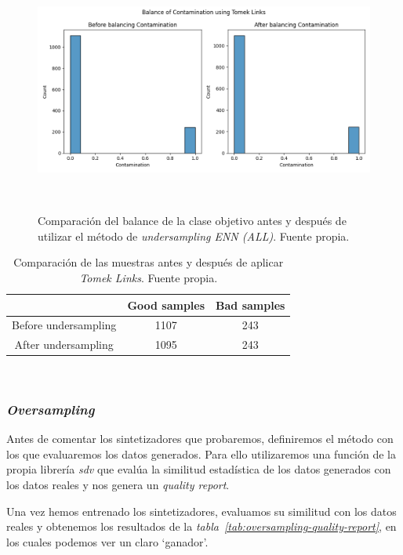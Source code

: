 \begin{figure}[!ht]
    \centering
    \includegraphics[width=0.8\linewidth]{media/images/balance.png}
    \caption{Comparación del balance de la clase objetivo antes y después de utilizar el método de \textit{undersampling ENN (ALL)}. Fuente propia.}\ \label{fig:balance-tl}
\end{figure}

\begin{table}
    \centering
    \begin{tabular}{|c|cc|} \hline
        & Good samples & Bad samples \\ \hline
        Before undersampling & 1107 & 243 \\
        After undersampling & 1095 & 243 \\ \hline
    \end{tabular}
    \caption{Comparación de las muestras antes y después de aplicar \textit{Tomek Links}. Fuente propia.}\ \label{tab:balance-tl-comparison}
\end{table}


\clearpage

\subsubsection{\textit{Oversampling}}

Antes de comentar los sintetizadores que probaremos, definiremos el método con los que evaluaremos los datos generados. Para ello utilizaremos una función de la propia librería \textit{sdv} que evalúa la similitud estadística de los datos generados con los datos reales y nos genera un \textit{quality report}.

Una vez hemos entrenado los sintetizadores, evaluamos su similitud con los datos reales y obtenemos los resultados de la \textit{tabla\ \ref{tab:oversampling-quality-report}}, en los cuales podemos ver un claro `ganador'.

\begin{table}[!ht]
    \centering
    \caption{Resultados del \textit{quality report} de los datos generados con los sintetizadores. Fuente propia}\ \label{tab:oversampling-quality-report}
\end{table}

